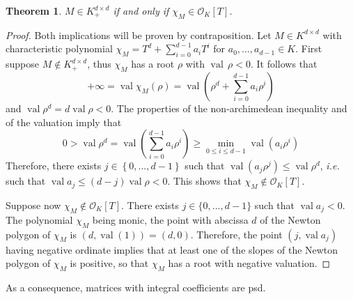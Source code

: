 \documentclass{elsarticle}
\theoremstyle{plain}
\newtheorem{theorem}{Theorem}[section]
\theoremstyle{definition}
\DeclareMathOperator{\val}{val}
\newcommand{\OK}{\mathcal{O}_K}
\begin{document}
\begin{theorem}
  \label{caracsdp}
  $M \in K^{d\times d}_+$ if and only if $\chi_M \in \OK[T]$.
\end{theorem}
\begin{proof}
  Both implications will be proven by contraposition.
  Let $M \in K^{d\times d}$ with characteristic polynomial $\chi_M = T^d + \sum_{i=0}^{d-1} a_i T^i$ for $a_0,...,a_{d-1} \in K$.
  First suppose $M \not \in K^{d\times d}_+$, thus $\chi_M$ has a root $\rho$ with $\val\,\rho<0$.
  It follows that
  $$
  + \infty = \val \chi_M (\rho) = \val \left(\rho^d+ \sum_{i=0}^{d-1} a_i \rho^i\right)
  $$ and $\val \rho^d = d \val \rho <0$.
  The properties of the non-archimedean inequality and of the valuation imply that
  $$
  0> \val \rho^d = \val\left(\sum_{i=0}^{d-1} a_i \rho^i\right) \geq
  \min_{0 \leq i \leq d-1} \val \left(a_i \rho^i\right)
  $$
  Therefore, there exists $j \in \left\{0,...,d-1\right\}$ such that $\val(a_j \rho^j) \le \val\rho^d$,
  {\it i.e.} such that $\val a_j \le (d-j) \val \rho <0$. This shows that $\chi_M \not\in \OK[T]$.


  Suppose now $\chi_M \not\in \OK[T]$. There exists $j \in \{0,...,d-1\}$ such that $\val a_j <0$.
  The polynomial $\chi_M$ being monic, the point with abscissa $d$ of the Newton polygon of $\chi_M$ is
  $(d,\val(1)) = (d,0)$. 
  Therefore, the point $(j, \val a_j)$ having negative ordinate implies that at least one of the slopes of
  the Newton polygon of $\chi_M$ is positive, so that $\chi_M$ has a root with negative valuation.
\end{proof}

As a consequence, matrices with integral coefficients are psd.
\end{document}

